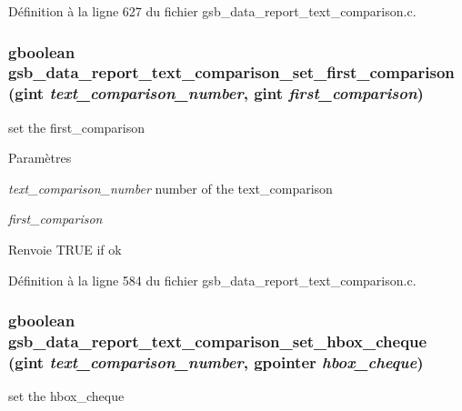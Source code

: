 Définition à la ligne 627 du fichier gsb\_\-data\_\-report\_\-text\_\-comparison.c.

\subsubsection[{gsb\_\-data\_\-report\_\-text\_\-comparison\_\-set\_\-first\_\-comparison}]{\setlength{\rightskip}{0pt plus 5cm}gboolean gsb\_\-data\_\-report\_\-text\_\-comparison\_\-set\_\-first\_\-comparison (gint {\em text\_\-comparison\_\-number}, \/  gint {\em first\_\-comparison})}\label{gsb__data__report__text__comparison_8h_a53c572b90eaa4b8c9ad1d8fd529c8ad5}
set the first\_\-comparison


\begin{DoxyParams}{Paramètres}
\item[{\em text\_\-comparison\_\-number}]number of the text\_\-comparison \item[{\em first\_\-comparison}]\end{DoxyParams}
\begin{DoxyReturn}{Renvoie}
TRUE if ok 
\end{DoxyReturn}


Définition à la ligne 584 du fichier gsb\_\-data\_\-report\_\-text\_\-comparison.c.

\subsubsection[{gsb\_\-data\_\-report\_\-text\_\-comparison\_\-set\_\-hbox\_\-cheque}]{\setlength{\rightskip}{0pt plus 5cm}gboolean gsb\_\-data\_\-report\_\-text\_\-comparison\_\-set\_\-hbox\_\-cheque (gint {\em text\_\-comparison\_\-number}, \/  gpointer {\em hbox\_\-cheque})}\label{gsb__data__report__text__comparison_8h_ad353b408c433fda5f33c0efec96906ad}
set the hbox\_\-cheque


